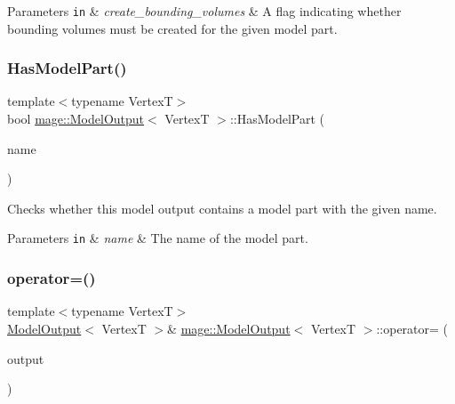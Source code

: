 \begin{DoxyParams}[1]{Parameters}
\mbox{\tt in}  & {\em create\+\_\+bounding\+\_\+volumes} & A flag indicating whether bounding volumes must be created for the given model part. \\
\hline
\end{DoxyParams}
\hypertarget{structmage_1_1_model_output_a90c6d42d13813b9c340bd1a250276a8d}{}\label{structmage_1_1_model_output_a90c6d42d13813b9c340bd1a250276a8d} 
\subsubsection{\texorpdfstring{Has\+Model\+Part()}{HasModelPart()}}
{\footnotesize\ttfamily template$<$typename VertexT$>$ \\
bool \hyperlink{structmage_1_1_model_output}{mage\+::\+Model\+Output}$<$ VertexT $>$\+::Has\+Model\+Part (\begin{DoxyParamCaption}\item[{const string \&}]{name }\end{DoxyParamCaption})\hspace{0.3cm}{\ttfamily [noexcept]}}

Checks whether this model output contains a model part with the given name.


\begin{DoxyParams}[1]{Parameters}
\mbox{\tt in}  & {\em name} & The name of the model part. \\
\hline
\end{DoxyParams}
\hypertarget{structmage_1_1_model_output_ada52bf380c0259a0d7ef855457e5a9da}{}\label{structmage_1_1_model_output_ada52bf380c0259a0d7ef855457e5a9da} 
\subsubsection{\texorpdfstring{operator=()}{operator=()}\hspace{0.1cm}{\footnotesize\ttfamily [1/2]}}
{\footnotesize\ttfamily template$<$typename VertexT$>$ \\
\hyperlink{structmage_1_1_model_output}{Model\+Output}$<$ VertexT $>$\& \hyperlink{structmage_1_1_model_output}{mage\+::\+Model\+Output}$<$ VertexT $>$\+::operator= (\begin{DoxyParamCaption}\item[{const \hyperlink{structmage_1_1_model_output}{Model\+Output}$<$ VertexT $>$ \&}]{output }\end{DoxyParamCaption})\hspace{0.3cm}{\ttfamily [delete]}}

